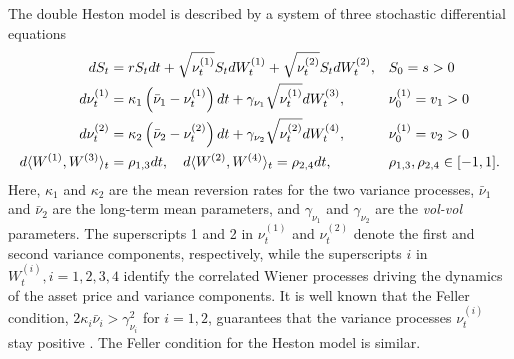 \documentclass[]{interact}
\theoremstyle{plain}%
\theoremstyle{definition}
\theoremstyle{remark}
\begin{document}
%
%

The double Heston model is described by a system of three stochastic differential equations
\begin{align*}
   d S_t &= r S_t dt + \sqrt{\nu_{t}^{(1)}} S_t dW_{t}^{(1)} + \sqrt{\nu_{t}^{(2)}} S_t dW_{t}^{(2)}, \notag  &&  S_0 = s > 0 \\
   d \nu_{t}^{(1)} &= \kappa_{1}\left(\bar{\nu}_{1} - \nu_{t}^{(1)}\right) dt + \gamma_{\nu_{1}} \sqrt{\nu_{t}^{(1)}} dW_{t}^{(3)}, && \nu_{0}^{(1)} = v_1 > 0 \\
  d \nu_{t}^{(2)} &= \kappa_{2}\left(\bar{\nu}_{2} - \nu_{t}^{(2)}\right) dt + \gamma_{\nu_{2}} \sqrt{\nu_{t}^{(2)}} dW_{t}^{(4)}, \notag && \nu_{0}^{(1)} = v_2 > 0 \\
   d\langle W^{(1)}, W^{(3)} \rangle_t &= \rho_{1,3} dt, \quad d\langle W^{(2)}, W^{(4)} \rangle_t = \rho_{2,4} dt, && \rho_{1,3}, \rho_{2,4} \in [-1,1].
\end{align*}
Here, $\kappa_1$ and $\kappa_2$ are the mean reversion rates for the two variance processes, $\bar{\nu}_1$ and $\bar{\nu}_2$ are the long-term mean parameters, and $\gamma_{\nu_{1}}$ and $\gamma_{\nu_{2}}$ are the \textit{vol-vol} parameters. The superscripts 1 and 2 in $\nu_{t}^{(1)}$ and $\nu_{t}^{(2)}$ denote the first and second variance components, respectively, while the superscripts $i$ in $W_t^{(i)},i=1,2,3,4$ identify the correlated Wiener processes driving the dynamics of the asset price and variance components. It is well known that the Feller condition, $2\kappa_i \bar{\nu}_i > \gamma_{\nu_i}^2$ for $i=1,2$, guarantees that the variance processes $\nu_t^{(i)}$ stay positive \cite{feller1951two}. The Feller condition for the Heston model is similar.
 
\end{document}
